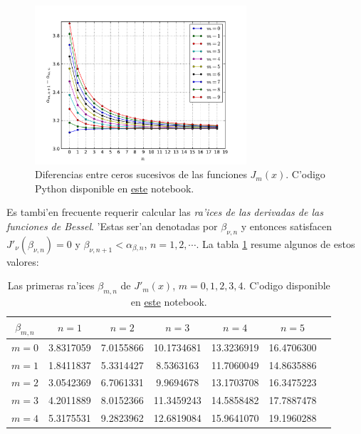 \begin{figure}[H]
\centering
\includegraphics[angle=0,width=0.7\textwidth]{figs/fig-Bessel-ceros-02.pdf}
\caption{Diferencias entre ceros sucesivos de las funciones $J_m(x)$. C'odigo Python disponible en \href{https://github.com/gfrubi/FM2/blob/master/Notebooks/Bessel-Ceros.ipynb}{este} notebook.}
\label{fig-0Jn2}
\end{figure}
Es tambi'en frecuente requerir calcular las \textit{ra'ices de las derivadas de las funciones de Bessel}. 'Estas ser'an denotadas por $\beta_{\nu,n}$ y entonces satisfacen $J'_\nu(\beta_{\nu,n})=0$ y $\beta_{\nu,n+1}<\alpha_{\beta,n}$, $n=1,2,\cdots$. La tabla  \ref{tabla:betanun} resume algunos de estos valores:
\begin{table}
\begin{center}
\begin{tabular}{ccccccc}
\hline $\beta_{m,n}$ & $n=1$ & $n=2$ & $n=3$ & $n=4$ & $n=5$ \\ \hline 
$m=0$ & 3.8317059 &  7.0155866 & 10.1734681 & 13.3236919 & 16.4706300\\
$m=1$ & 1.8411837 &  5.3314427 &  8.5363163 & 11.7060049 & 14.8635886 \\
$m=2$ & 3.0542369 &  6.7061331 &  9.9694678 & 13.1703708 & 16.3475223 \\
$m=3$ & 4.2011889 &  8.0152366 & 11.3459243 & 14.5858482 & 17.7887478 \\
$m=4$ & 5.3175531 &  9.2823962 & 12.6819084 & 15.9641070 & 19.1960288 \\
\hline 
\end{tabular} 
\caption{Las primeras ra'ices $\beta_{m,n}$ de $J'_m(x)$, $m=0,1,2,3,4$. C'odigo disponible en \href{https://github.com/gfrubi/FM2/blob/master/Notebooks/Bessel-Ceros.ipynb}{este} notebook.}
\label{tabla:betanun}
\end{center}
\end{table}

